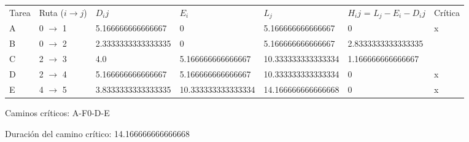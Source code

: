 \begin{table}[]
\begin{tabular}{lllllll}
Tarea & Ruta   ($i \longrightarrow j$) & $D_ij$ & $E_i$ & $L_j$ & $H_ij$  = $L_j - E_i - D_ij$ & Crítica \\
A & 0 $\longrightarrow$ 1 & 5.166666666666667 & 0 & 5.166666666666667 & 0 & x \\
B & 0 $\longrightarrow$ 2 & 2.3333333333333335 & 0 & 5.166666666666667 & 2.8333333333333335 &  \\
C & 2 $\longrightarrow$ 3 & 4.0 & 5.166666666666667 & 10.333333333333334 & 1.166666666666667 &  \\
D & 2 $\longrightarrow$ 4 & 5.166666666666667 & 5.166666666666667 & 10.333333333333334 & 0 & x \\
E & 4 $\longrightarrow$ 5 & 3.8333333333333335 & 10.333333333333334 & 14.166666666666668 & 0 & x
\end{tabular}
\end{table}




Caminos críticos:
A-F0-D-E

Duración del camino crítico: 14.166666666666668